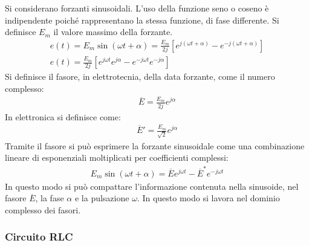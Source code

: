 \documentclass{article}
\numberwithin{equation}{subsection}
\begin{document}
Si considerano forzanti sinusoidali. L'uso della funzione seno o coseno è indipendente poiché rappresentano la stessa funzione, di fase differente. Si definisce $E_m$ il 
valore massimo della forzante. 
\begin{gather*}
    e(t)=E_m\sin(\omega t+\alpha)=\displaystyle\frac{E_m}{2j}\left[e^{j(\omega t+\alpha)}-e^{-j(\omega t +\alpha)}\right]\\
    e(t)=\displaystyle\frac{E_m}{2j}\left[e^{j\omega t}e^{j\alpha}-e^{-j\omega t}e^{-j\alpha}\right]
\end{gather*}
Si definisce il fasore, in elettrotecnia, della data forzante, come il numero complesso:
\begin{gather*}
    \overline{E}=\displaystyle\frac{E_m}{2j}e^{j\alpha}
\end{gather*}
In elettronica si definisce come:
\begin{gather*}
    \overline{E}'=\displaystyle\frac{E_m}{\sqrt2}e^{j\alpha}
\end{gather*}
Tramite il fasore si può esprimere la forzante sinusoidale come una combinazione lineare di esponenziali moltiplicati per coefficienti complessi: 
\begin{gather*}
    E_m\sin(\omega t+\alpha)=\overline{E}e^{j\omega t}-\overline{E}^*e^{-j\omega t}
\end{gather*} 
In questo modo si può compattare l'informazione contenuta nella sinusoide, nel fasore $\overline{E}$, la fase $\alpha$ e la pulsazione $\omega$. In questo modo si lavora nel 
dominio complesso dei fasori. 

\subsubsection{Circuito RLC}
\end{document}
